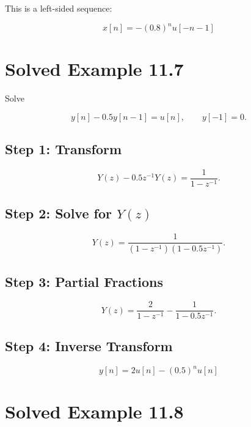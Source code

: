 This is a left-sided sequence:

\[
\boxed{
x[n]=-(0.8)^n u[-n-1]
}
\]


\section{Solved Example 11.7}

Solve

\[
y[n]-0.5y[n-1]=u[n],
\qquad y[-1]=0.
\]


\subsection{Step 1: Transform}

\[
Y(z)-0.5z^{-1}Y(z)=
\frac{1}{1-z^{-1}}.
\]


\subsection{Step 2: Solve for \(Y(z)\)}

\[
Y(z)=
\frac{1}
{(1-z^{-1})(1-0.5z^{-1})}.
\]


\subsection{Step 3: Partial Fractions}

\[
Y(z)=
\frac{2}{1-z^{-1}}
-
\frac{1}{1-0.5z^{-1}}.
\]


\subsection{Step 4: Inverse Transform}

\[
\boxed{
y[n]=
2u[n]-(0.5)^n u[n]
}
\]


\section{Solved Example 11.8}

